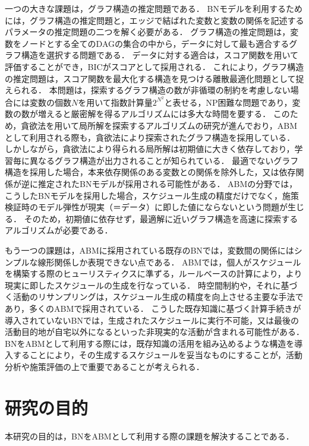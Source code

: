 一つの大きな課題は，グラフ構造の推定問題である．
BNモデルを利用するためには，グラフ構造の推定問題と，エッジで結ばれた変数と変数の関係を記述するパラメータの推定問題の二つを解く必要がある．
グラフ構造の推定問題は，変数をノードとする全てのDAGの集合の中から，データに対して最も適合するグラフ構造を選択する問題である．
データに対する適合は，スコア関数を用いて評価することができ，BICがスコアとして採用される\cite{Xiang1997}．
これにより，グラフ構造の推定問題は，スコア関数を最大化する構造を見つける離散最適化問題として捉えられる．
本問題は，探索するグラフ構造の数が非循環の制約を考慮しない場合には変数の個数$N$を用いて指数計算量$2^{N^2}$と表せる，NP困難な問題であり，変数の数が増えると厳密解を得るアルゴリズムには多大な時間を要する\cite{Xiang1997}．
このため，貪欲法を用いて局所解を探索するアルゴリズムの研究が進んでおり\cite{Xiang1997}，ABMとして利用される際も，貪欲法により探索されたグラフ構造を採用している．
しかしながら，貪欲法により得られる局所解は初期値に大きく依存しており，学習毎に異なるグラフ構造が出力されることが知られている\cite{Xiang1997}．
最適でないグラフ構造を採用した場合，本来依存関係のある変数との関係を除外した，又は依存関係が逆に推定されたBNモデルが採用される可能性がある．
ABMの分野では，こうしたBNモデルを採用した場合，スケジュール生成の精度だけでなく，施策検証時のモデル弾性が現実（＝データ）に即した値にならないという問題が生じる．
そのため，初期値に依存せず，最適解に近いグラフ構造を高速に探索するアルゴリズムが必要である．

もう一つの課題は，ABMに採用されている既存のBNでは，変数間の関係にはシンプルな線形関係しか表現できない点である\cite{Xiang1997}．
ABMでは，個人がスケジュールを構築する際のヒューリスティクスに準ずる，ルールベースの計算により，より現実に即したスケジュールの生成を行なっている．
時空間制約や，それに基づく活動のリサンプリングは，スケジュール生成の精度を向上させる主要な手法であり，多くのABMで採用されている\cite{Xiang1997}．
こうした既存知識に基づく計算手続きが導入されていないBNでは，生成されたスケジュールに実行不可能，又は最後の活動目的地が自宅以外になるといった非現実的な活動が含まれる可能性がある．
BNをABMとして利用する際には，既存知識の活用を組み込めるような構造を導入することにより，その生成するスケジュールを妥当なものにすることが，活動分析や施策評価の上で重要であることが考えられる．

\section{研究の目的}\label{1.2}
本研究の目的は，BNをABMとして利用する際の課題を解決することである．

